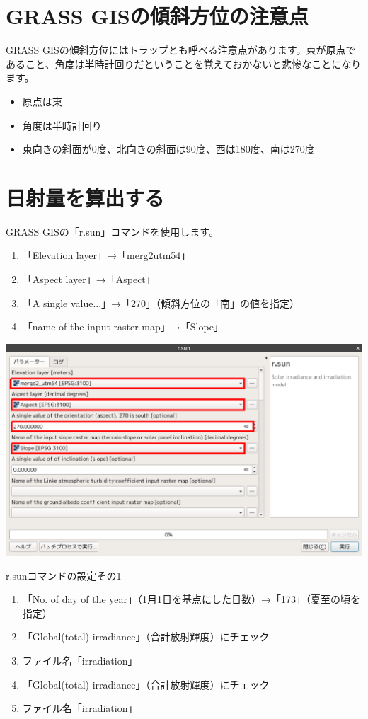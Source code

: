 \documentclass[14Q,twocolumn]{jsarticle}
\makeatletter
\newenvironment{figurehere}
  {\def\@captype{figure}}
  {}
\makeatother
\begin{document}
\section{GRASS GISの傾斜方位の注意点}
GRASS GISの傾斜方位にはトラップとも呼べる注意点があります。東が原点であること、角度は半時計回りだということを覚えておかないと悲惨なことになります。

\begin{itemize}
\item 原点は東
\item 角度は半時計回り
\item  東向きの斜面が0度、北向きの斜面は90度、西は180度、南は270度
\end{itemize}


\section{日射量を算出する}
GRASS GISの「r.sun」コマンドを使用します。

\begin{enumerate}
\item 「Elevation layer」→「merg2utm54」
\item 「Aspect layer」→「Aspect」
\item 「A single value...」→「270」（傾斜方位の「南」の値を指定）
\item 「name of the input raster map」→「Slope」
\end{enumerate}

\begin{figurehere}
\centering
\includegraphics[width=1\linewidth]{18.png}
\caption{r.sunコマンドの設定その1}
\end{figurehere}


\begin{enumerate}
\item 「No. of day of the year」（1月1日を基点にした日数）→「173」（夏至の頃を指定） 
\item 「Global(total) irradiance」（合計放射輝度）にチェック
\item  ファイル名「irradiation」
\item 「Global(total) irradiance」（合計放射輝度）にチェック
\item ファイル名「irradiation」
\end{enumerate}
\end{document}
